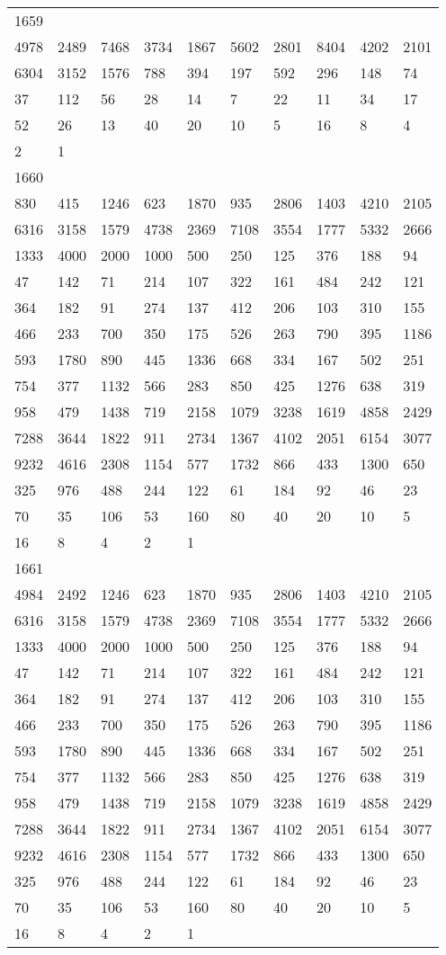 \begin{longtable}{*{10}{l}}
1659&&&&&&&&&\\
4978& 2489& 7468& 3734& 1867& 5602& 2801& 8404& 4202& 2101\\
6304& 3152& 1576& 788& 394& 197& 592& 296& 148& 74\\
37& 112& 56& 28& 14& 7& 22& 11& 34& 17\\
52& 26& 13& 40& 20& 10& 5& 16& 8& 4\\
2& 1& \\

1660&&&&&&&&&\\
830& 415& 1246& 623& 1870& 935& 2806& 1403& 4210& 2105\\
6316& 3158& 1579& 4738& 2369& 7108& 3554& 1777& 5332& 2666\\
1333& 4000& 2000& 1000& 500& 250& 125& 376& 188& 94\\
47& 142& 71& 214& 107& 322& 161& 484& 242& 121\\
364& 182& 91& 274& 137& 412& 206& 103& 310& 155\\
466& 233& 700& 350& 175& 526& 263& 790& 395& 1186\\
593& 1780& 890& 445& 1336& 668& 334& 167& 502& 251\\
754& 377& 1132& 566& 283& 850& 425& 1276& 638& 319\\
958& 479& 1438& 719& 2158& 1079& 3238& 1619& 4858& 2429\\
7288& 3644& 1822& 911& 2734& 1367& 4102& 2051& 6154& 3077\\
9232& 4616& 2308& 1154& 577& 1732& 866& 433& 1300& 650\\
325& 976& 488& 244& 122& 61& 184& 92& 46& 23\\
70& 35& 106& 53& 160& 80& 40& 20& 10& 5\\
16& 8& 4& 2& 1& \\

1661&&&&&&&&&\\
4984& 2492& 1246& 623& 1870& 935& 2806& 1403& 4210& 2105\\
6316& 3158& 1579& 4738& 2369& 7108& 3554& 1777& 5332& 2666\\
1333& 4000& 2000& 1000& 500& 250& 125& 376& 188& 94\\
47& 142& 71& 214& 107& 322& 161& 484& 242& 121\\
364& 182& 91& 274& 137& 412& 206& 103& 310& 155\\
466& 233& 700& 350& 175& 526& 263& 790& 395& 1186\\
593& 1780& 890& 445& 1336& 668& 334& 167& 502& 251\\
754& 377& 1132& 566& 283& 850& 425& 1276& 638& 319\\
958& 479& 1438& 719& 2158& 1079& 3238& 1619& 4858& 2429\\
7288& 3644& 1822& 911& 2734& 1367& 4102& 2051& 6154& 3077\\
9232& 4616& 2308& 1154& 577& 1732& 866& 433& 1300& 650\\
325& 976& 488& 244& 122& 61& 184& 92& 46& 23\\
70& 35& 106& 53& 160& 80& 40& 20& 10& 5\\
16& 8& 4& 2& 1& \\


\end{longtable}
